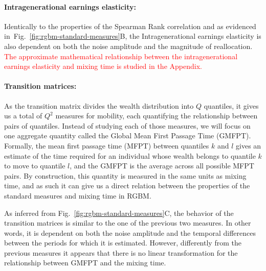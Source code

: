 \documentclass[11pt]{article}
\newcommand{\ie}{{\it i.e.}\xspace}
\newcommand{\fref}[1]{Fig.~\ref{fig:#1}}
\numberwithin{equation}{section}
\begin{document}
\FloatBarrier

\paragraph{Intragenerational earnings elasticity:} 
Identically to the properties of the Spearman Rank correlation and as evidenced in~\fref{rgbm-standard-measures}B, the Intragenerational earnings elasticity is also dependent on both the noise amplitude and the magnitude of reallocation. \textcolor{red}{The approximate mathematical relationship between the intragenerational earnings elasticity and mixing time is studied in the Appendix.}


\paragraph{Transition matrices:} As the transition matrix divides the wealth distribution into $Q$ quantiles, it gives us a total of $Q^2$ measures for mobility, each quantifying the relationship between pairs of quantiles. Instead of studying each of those measures, we will focus on one aggregate quantity called the Global Mean First Passage Time (GMFPT). Formally, the mean first passage time (MFPT) between quantiles $k$ and $l$ gives an estimate of the time required for an individual whose wealth belongs to quantile $k$ to move to quantile $l$, and the GMFPT is the average across all possible MFPT pairs. By construction, this quantity is measured in the same units as mixing time, and as such it can give us a direct relation between the properties of the standard measures and mixing time in RGBM.

As inferred from \fref{rgbm-standard-measures}C, the behavior of the transition matrices is similar to the one of the previous two measures. In other words, it is dependent on both the noise amplitude and the temporal differences between the periods for which it is estimated. However, differently from the previous measures it appears that there is no linear transformation for the relationship between GMFPT and the mixing time.
\end{document}
